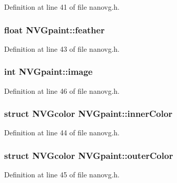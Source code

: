 Definition at line 41 of file nanovg.\+h.

\hypertarget{struct_n_v_gpaint_abab7d2a8c04a8964f8e3bf25d2c523af}{
\subsubsection[{feather}]{\setlength{\rightskip}{0pt plus 5cm}float N\+V\+Gpaint\+::feather}}\label{struct_n_v_gpaint_abab7d2a8c04a8964f8e3bf25d2c523af}


Definition at line 43 of file nanovg.\+h.

\hypertarget{struct_n_v_gpaint_ab6baf3fc279d73bf2de69390e8eb05d2}{
\subsubsection[{image}]{\setlength{\rightskip}{0pt plus 5cm}int N\+V\+Gpaint\+::image}}\label{struct_n_v_gpaint_ab6baf3fc279d73bf2de69390e8eb05d2}


Definition at line 46 of file nanovg.\+h.

\hypertarget{struct_n_v_gpaint_aeccf092ff8f25f886d64db03b51af9e3}{
\subsubsection[{inner\+Color}]{\setlength{\rightskip}{0pt plus 5cm}struct {\bf N\+V\+Gcolor} N\+V\+Gpaint\+::inner\+Color}}\label{struct_n_v_gpaint_aeccf092ff8f25f886d64db03b51af9e3}


Definition at line 44 of file nanovg.\+h.

\hypertarget{struct_n_v_gpaint_a4044b05ab26b48a15a68b6fd30993211}{
\subsubsection[{outer\+Color}]{\setlength{\rightskip}{0pt plus 5cm}struct {\bf N\+V\+Gcolor} N\+V\+Gpaint\+::outer\+Color}}\label{struct_n_v_gpaint_a4044b05ab26b48a15a68b6fd30993211}


Definition at line 45 of file nanovg.\+h.

